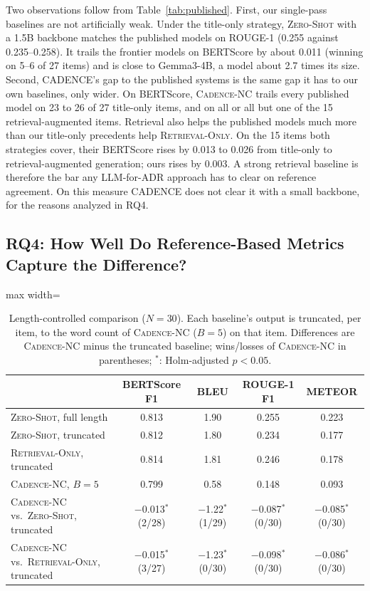\documentclass[preprint,12pt,authoryear]{elsarticle}
\newcommand{\sysZS}{\textsc{Zero-Shot}}
\newcommand{\sysRO}{\textsc{Retrieval-Only}}
\newcommand{\sysNC}{\textsc{Cadence-NC}}
\renewcommand{\_}{\textunderscore\allowbreak{}}
\begin{document}
Two observations follow from Table~\ref{tab:published}. First, our single-pass baselines are not artificially weak. Under the title-only strategy, \sysZS{} with a 1.5B backbone matches the published models on ROUGE-1 (0.255 against 0.235--0.258). It trails the frontier models on BERTScore by about 0.011 (winning on 5--6 of 27 items) and is close to Gemma3-4B, a model about 2.7 times its size. Second, CADENCE's gap to the published systems is the same gap it has to our own baselines, only wider. On BERTScore, \sysNC{} trails every published model on 23 to 26 of 27 title-only items, and on all or all but one of the 15 retrieval-augmented items. Retrieval also helps the published models much more than our title-only precedents help \sysRO{}. On the 15 items both strategies cover, their BERTScore rises by 0.013 to 0.026 from title-only to retrieval-augmented generation; ours rises by 0.003. A strong retrieval baseline is therefore the bar any LLM-for-ADR approach has to clear on reference agreement. On this measure CADENCE does not clear it with a small backbone, for the reasons analyzed in RQ4.

\subsection{RQ4: How Well Do Reference-Based Metrics Capture the Difference?}
\label{sec:rq4}

\begin{table}[!htbp]
\caption{Length-controlled comparison ($N=30$). Each baseline's output is truncated, per item, to the word count of \sysNC{} ($B=5$) on that item. Differences are \sysNC{} minus the truncated baseline; wins/losses of \sysNC{} in parentheses; $^{*}$: Holm-adjusted $p<0.05$.\label{tab:rq4}}
\centering
\begin{adjustbox}{max width=\textwidth}
\begin{tabular}{@{}lcccc@{}}
\toprule
 & BERTScore F1 & BLEU & ROUGE-1 F1 & METEOR \\
\midrule
\sysZS{}, full length & 0.813 & 1.90 & 0.255 & 0.223 \\
\sysZS{}, truncated  & 0.812 & 1.80 & 0.234 & 0.177 \\
\sysRO{}, truncated  & 0.814 & 1.81 & 0.246 & 0.178 \\
\sysNC{}, $B=5$ & 0.799 & 0.58 & 0.148 & 0.093 \\
\midrule
\sysNC{} vs.\ \sysZS{}, truncated & $-$0.013$^{*}$ (2/28) & $-$1.22$^{*}$ (1/29) & $-$0.087$^{*}$ (0/30) & $-$0.085$^{*}$ (0/30) \\
\sysNC{} vs.\ \sysRO{}, truncated & $-$0.015$^{*}$ (3/27) & $-$1.23$^{*}$ (0/30) & $-$0.098$^{*}$ (0/30) & $-$0.086$^{*}$ (0/30) \\
\bottomrule
\end{tabular}
\end{adjustbox}
\end{table}
\FloatBarrier
\end{document}
